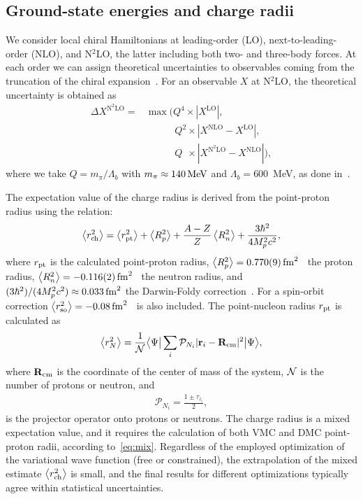 \documentclass[aps,prc,twocolumn,superscriptaddress,floatfix]{revtex4-1}
\begin{document}
\subsection{Ground-state energies and charge radii}
We consider local chiral Hamiltonians at leading-order (LO), 
next-to-leading-order (NLO), and N$^2$LO, the latter including both two- and three-body forces.
At each order we can assign theoretical uncertainties to observables coming from the 
truncation of the chiral expansion~\cite{Epelbaum:2015epja}. For an observable $X$ at N$^2$LO, 
the theoretical uncertainty is obtained as
\begin{align}
\Delta X^{\text{N}^2\text{LO}}=&\max(Q^4\times|X^{\text{LO}}|,\nonumber \\ 
&\phantom{\max(\,}Q^2\times|X^{\text{NLO}}-X^{\text{LO}}|, \nonumber \\
&\phantom{\max(\,}Q^{\phantom{2}}\times|X^{\text{N}^2\text{LO}}-X^{\text{NLO}}|),
\label{eq:err}
\end{align}
where we take $Q=m_\pi/\Lambda_b$ with $m_\pi\approx140\,\rm MeV$ and $\Lambda_b=600$~MeV, 
as done in~\cite{Lynn:2016,Lonardoni:2017afdmc}.

The expectation value of the charge radius is derived from the point-proton radius using the relation:
\begin{align}
	\left\langle r_{\rm ch}^2\right\rangle=
	\left\langle r_{\rm pt}^2\right\rangle+
	\left\langle R_p^2\right\rangle+
	\frac{A-Z}{Z}\left\langle R_n^2\right\rangle+
	\frac{3\hbar^2}{4M_p^2c^2},
	\label{eq:rch}
\end{align}
where $r_{\rm pt}$ is the calculated point-proton radius,
$\left\langle R_p^2\right\rangle=0.770(9)\,\rm{fm}^2$~\cite{Beringer:2012} the proton radius, 
$\left\langle R_n^2\right\rangle=-0.116(2)\,\rm{fm}^2$~\cite{Beringer:2012} the neutron radius,
and $(3\hbar^2)/(4M_p^2c^2)\approx0.033\,\rm{fm}^2$ the Darwin-Foldy correction~\cite{Friar:1997}.
For  a spin-orbit correction 
$\left\langle r_{\rm so}^2\right\rangle=-0.08\,\rm{fm}^2$~\cite{Ong:2010} is also included.
The point-nucleon radius $r_{\rm pt}$ is calculated as
\begin{align}
	\left\langle r_N^2\right\rangle=\frac{1}{{\cal N}}\big\langle\Psi\big|\sum_i\mathcal P_{N_i} |\vb{r}_i-\vb{R}_{\rm cm}|^2\big|\Psi\big\rangle,
\end{align}
where $\vb{R}_{\rm cm}$ is the coordinate of the center of mass of the system,
${\cal N}$ is the number of protons or neutron, and 
\begin{align}
	\mathcal P_{N_i}=\frac{1\pm\tau_{z_i}}{2},
	\label{eq:proj}
\end{align}
is the projector operator onto protons or neutrons. 
The charge radius is a mixed expectation value, and it requires the calculation of both
VMC and DMC point-proton radii, according to~\cref{eq:mix}. 
Regardless of the employed optimization of the variational wave function (free or constrained), 
the extrapolation of the mixed estimate $\left\langle r_{\rm ch}^2\right\rangle$ is small, 
and the final results for different optimizations typically agree within statistical uncertainties.
\end{document}
